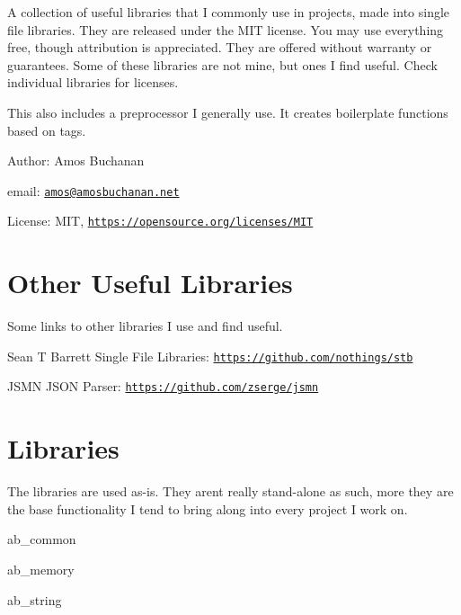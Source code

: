 A collection of useful libraries that I commonly use in projects, made into single file libraries. They are released under the M\+IT license. You may use everything free, though attribution is appreciated. They are offered without warranty or guarantees. Some of these libraries are not mine, but ones I find useful. Check individual libraries for licenses.

This also includes a preprocessor I generally use. It creates boilerplate functions based on tags.


\begin{DoxyItemize}
\item Author\+: Amos Buchanan
\item email\+: \href{mailto:amos@amosbuchanan.net}{\tt amos@amosbuchanan.\+net}
\item License\+: M\+IT, \href{https://opensource.org/licenses/MIT}{\tt https\+://opensource.\+org/licenses/\+M\+IT}
\end{DoxyItemize}

\section*{Other Useful Libraries}

Some links to other libraries I use and find useful.


\begin{DoxyItemize}
\item Sean T Barrett Single File Libraries\+: \href{https://github.com/nothings/stb}{\tt https\+://github.\+com/nothings/stb}
\item J\+S\+MN J\+S\+ON Parser\+: \href{https://github.com/zserge/jsmn}{\tt https\+://github.\+com/zserge/jsmn}
\end{DoxyItemize}

\section*{Libraries}

The libraries are used as-\/is. They aren\textquotesingle{}t really stand-\/alone as such, more they are the base functionality I tend to bring along into every project I work on.


\begin{DoxyItemize}
\item ab\+\_\+common
\item ab\+\_\+memory
\item ab\+\_\+string
\end{DoxyItemize}

